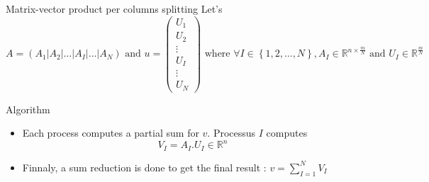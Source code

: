 \documentclass[compress,10pt,aspectratio=169]{beamer}
\begin{document}
\begin{frame}[fragile]{Matrix-vector product per columns splitting}
  \scriptsize
  Let's
  \[
    A = \left(A_{1}|A_{2}|\ldots|A_{I}|\ldots|A_{N}\right)\mbox{ and }
    u=\left(\begin{array}{c}
      U_{1} \\ \hline
      U_{2} \\ \hline
      \vdots \\ \hline
      U_{I} \\ \hline
      \vdots \\ \hline
      U_{N}
    \end{array} \right)
    \mbox{ where } \forall I\in\left\{1,2,\ldots,N\right\}, A_{I}\in\mathbb{R}^{n\times \frac{m}{N}}\mbox{ and } U_{I}\in\mathbb{R}^{\frac{m}{N}}
    \]

    \begin{exampleblock}{Algorithm}
      \begin{itemize}
      \item Each process computes a partial sum for $v$. Processus $I$ computes
        \[
        V_{I} = A_{I}.U_{I}\in\mathbb{R}^{n}
        \]
      \item Finnaly, a sum reduction is done to get the final result :
        $\displaystyle
        v = \sum_{I=1}^{N}V_{I}
        $
      \end{itemize}
    \end{exampleblock}
    
\end{frame}
\end{document}
